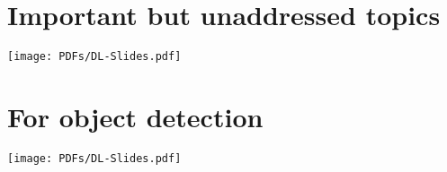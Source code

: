 
\section{Important but unaddressed topics}
\texttt{[image: PDFs/DL-Slides.pdf]}

\section{For object detection}
\texttt{[image: PDFs/DL-Slides.pdf]}

